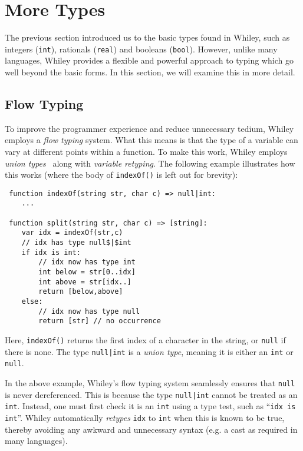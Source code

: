 \newpage
\section{More Types}
The previous section introduced us to the basic types found in Whiley,
such as integers (\lstinline{int}), rationals (\lstinline{real}) and
booleans (\lstinline{bool}).  However, unlike many languages, Whiley
provides a flexible and powerful approach to typing which go well
beyond the basic forms.  In this section, we will examine this in more
detail.

\subsection{Flow Typing}
To improve the programmer experience and reduce unnecessary tedium,
Whiley employs a {\em flow typing} system.  What this means is that
the type of a variable can vary at different points within a function.
To make this work, Whiley employs {\em union types}~\cite{BC91,IN07} along with {\em variable retyping}.  The
following example illustrates how this works (where the body of
\lstinline{indexOf()} is left out for brevity):

\begin{lstlisting}
 function indexOf(string str, char c) => null|int:
    ...

 function split(string str, char c) => [string]:
    var idx = indexOf(str,c)
    // idx has type null$|$int
    if idx is int:
        // idx now has type int
        int below = str[0..idx]
        int above = str[idx..]
        return [below,above]
    else:
        // idx now has type null
        return [str] // no occurrence
\end{lstlisting}
Here, \lstinline{indexOf()} returns the first index of a character in
the string, or \lstinline{null} if there is none.  The type
\lstinline{null|int} is a {\em union type}, meaning it is either an
\lstinline{int} or \lstinline{null}.

In the above example, Whiley's flow typing system seamlessly ensures
that \lstinline{null} is never dereferenced.  This is because the type
\lstinline{null|int} cannot be treated as an \lstinline{int}.
Instead, one must first check it is an \lstinline{int} using a type
test, such as ``\lstinline{idx is int}''.  Whiley automatically
{\em retypes} \lstinline{idx} to \lstinline{int} when this is known to be
true, thereby avoiding any awkward and unnecessary syntax (e.g. a cast
as required in many languages).

